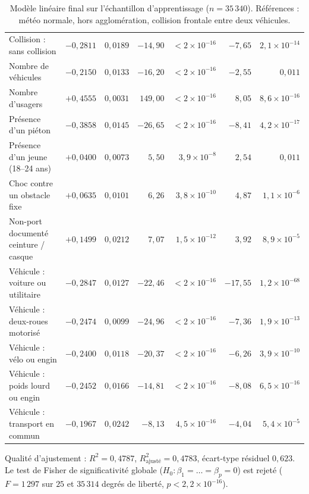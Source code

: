 \documentclass[11pt,a4paper]{article}
\begin{document}
\begin{table}[H]
{\begin{tabular}{lrrrrrr}
Collision : sans collision                  & $-0{,}2811$ & $0{,}0189$ & $-14{,}90$ & $<2\times10^{-16}$ & $-7{,}65$ & $2{,}1\times10^{-14}$ \\
Nombre de véhicules                         & $-0{,}2150$ & $0{,}0133$ & $-16{,}20$ & $<2\times10^{-16}$ & $-2{,}55$ & $0{,}011$ \\
Nombre d'usagers                            & $+0{,}4555$ & $0{,}0031$ & $149{,}00$ & $<2\times10^{-16}$ & $8{,}05$  & $8{,}6\times10^{-16}$ \\
Présence d'un piéton                        & $-0{,}3858$ & $0{,}0145$ & $-26{,}65$ & $<2\times10^{-16}$ & $-8{,}41$ & $4{,}2\times10^{-17}$ \\
Présence d'un jeune (18--24 ans)            & $+0{,}0400$ & $0{,}0073$ & $5{,}50$   & $3{,}9\times10^{-8}$ & $2{,}54$ & $0{,}011$ \\
Choc contre un obstacle fixe                & $+0{,}0635$ & $0{,}0101$ & $6{,}26$   & $3{,}8\times10^{-10}$ & $4{,}87$ & $1{,}1\times10^{-6}$ \\
Non-port documenté ceinture / casque        & $+0{,}1499$ & $0{,}0212$ & $7{,}07$   & $1{,}5\times10^{-12}$ & $3{,}92$ & $8{,}9\times10^{-5}$ \\
Véhicule : voiture ou utilitaire            & $-0{,}2847$ & $0{,}0127$ & $-22{,}46$ & $<2\times10^{-16}$ & $-17{,}55$ & $1{,}2\times10^{-68}$ \\
Véhicule : deux-roues motorisé              & $-0{,}2474$ & $0{,}0099$ & $-24{,}96$ & $<2\times10^{-16}$ & $-7{,}36$ & $1{,}9\times10^{-13}$ \\
Véhicule : vélo ou engin                    & $-0{,}2400$ & $0{,}0118$ & $-20{,}37$ & $<2\times10^{-16}$ & $-6{,}26$ & $3{,}9\times10^{-10}$ \\
Véhicule : poids lourd ou engin             & $-0{,}2452$ & $0{,}0166$ & $-14{,}81$ & $<2\times10^{-16}$ & $-8{,}08$ & $6{,}5\times10^{-16}$ \\
Véhicule : transport en commun              & $-0{,}1967$ & $0{,}0242$ & $-8{,}13$  & $4{,}5\times10^{-16}$ & $-4{,}04$ & $5{,}4\times10^{-5}$ \\
\bottomrule
\end{tabular}}
\caption{Modèle linéaire final sur l'échantillon d'apprentissage ($n = 35\,340$). Références : météo normale, hors agglomération, collision frontale entre deux véhicules.}
\label{tab:reg_final}
\end{table}

Qualité d'ajustement : $R^2 = 0{,}4787$, $R^2_{\text{ajusté}} = 0{,}4783$, écart-type résiduel $0{,}623$. Le test de Fisher de significativité globale ($H_0 : \beta_1 = \dots = \beta_p = 0$) est rejeté ($F = 1\,297$ sur $25$ et $35\,314$ degrés de liberté, $p < 2{,}2\times10^{-16}$).
\end{document}
